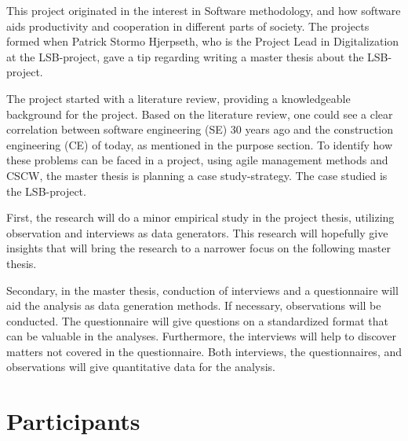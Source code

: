 This project originated in the interest in Software methodology, and how software aids productivity and cooperation in different parts of society. The projects formed when Patrick Stormo Hjerpseth, who is the Project Lead in Digitalization at the LSB-project, gave a tip regarding writing a master thesis about the LSB-project.

The project started with a literature review, providing a knowledgeable background for the project. Based on the literature review, one could see a clear correlation between software engineering (SE) 30 years ago and the construction engineering (CE) of today, as mentioned in the purpose section. To identify how these problems can be faced in a project, using agile management methods and CSCW, the master thesis is planning a case study-strategy. The case studied is the LSB-project. 

First, the research will do a minor empirical study in the project thesis, utilizing observation and interviews as data generators. This research will hopefully give insights that will bring the research to a narrower focus on the following master thesis. 

Secondary, in the master thesis, conduction of interviews and a questionnaire will aid the analysis as data generation methods. If necessary, observations will be conducted. The questionnaire will give questions on a standardized format that can be valuable in the analyses. Furthermore, the interviews will help to discover matters not covered in the questionnaire. Both interviews, the questionnaires, and observations will give quantitative data for the analysis.


\section*{Participants}

